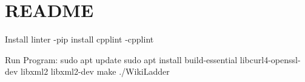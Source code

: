 \chapter{README}
\hypertarget{md_README}{}\label{md_README}
Install linter -\/pip install cpplint -\/cpplint   

Run Program\+: sudo apt update sudo apt install build-\/essential libcurl4-\/openssl-\/dev libxml2 libxml2-\/dev make ./\+Wiki\+Ladder 